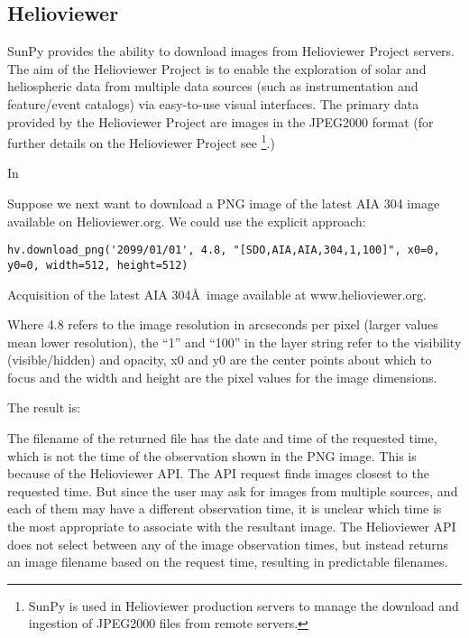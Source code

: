 \subsection{Helioviewer}

SunPy provides the ability to download images from Helioviewer Project
servers.  The aim of the Helioviewer Project is to enable the
exploration of solar and heliospheric data from multiple data sources
(such as instrumentation and feature/event catalogs) via easy-to-use
visual interfaces.  The primary data provided by the Helioviewer
Project are images in the JPEG2000 format (for further details on the
Helioviewer Project see \cite{}\footnote{SunPy is used in Helioviewer
  production servers to manage the download and ingestion of JPEG2000
  files from remote servers.}.)

In

Suppose we next want to download a PNG image of the latest AIA 304
image available on Helioviewer.org. We could use the explicit
approach:

\begin{listing}
\begin{verbatim}
hv.download_png('2099/01/01', 4.8, "[SDO,AIA,AIA,304,1,100]", x0=0, y0=0, width=512, height=512)
\end{verbatim}
\caption{Acquisition of the latest AIA 304\AA\ image available at www.helioviewer.org.}
\label{code:downloadlatestpng}
\end{listing}

Where 4.8 refers to the image resolution in arcseconds per pixel
(larger values mean lower resolution), the “1” and “100” in the layer
string refer to the visibility (visible/hidden) and opacity, x0 and y0
are the center points about which to focus and the width and height
are the pixel values for the image dimensions.

The result is:



The filename of the returned file has the date and time of the
requested time, which is not the time of the observation shown in the
PNG image.  This is because of the Helioviewer API.  The API request
finds images closest to the requested time. But since the user may ask
for images from multiple sources, and each of them may have a
different observation time, it is unclear which time is the most
appropriate to associate with the resultant image.  The Helioviewer
API does not select between any of the image observation times, but
instead returns an image filename based on the request time, resulting
in predictable filenames.

